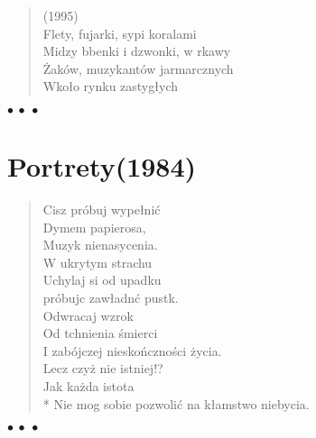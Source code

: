 \documentclass{article} %
\newenvironment{wiersz}[1]
	{\begin{verse} \hspace*{-1em}{\bf #1}}
	{\end{verse} \begin{center}$\bullet\ \bullet\ \bullet$\end{center}}
\newenvironment{wierszd}[2]
	{\begin{verse} \hspace*{-1em}{\bf #1}\hfill{\small{(#2)}}\\[.5ex] }
	{\end{verse} \begin{center}$\bullet\ \bullet\ \bullet$\end{center}}
\newcommand{\chap}[1]{\newpage\section*{#1}}
\newcommand{\e}{\eob}
\renewcommand{\a}{\aob}
\renewcommand{\o}{\'{o}}
\newcommand{\n}{\'{n}}
\newcommand{\s}{\'{s}}
\newcommand{\ci}{\'{c}}
\begin{document}
\begin{wierszd}
{Praga}{1995}
Flety, fujarki, sypi{\a} koralami \\
Mi{\e}dzy b{\e}benki i dzwonki, w r{\e}kawy \\
\.{Z}ak{\o}w, muzykant{\o}w jarmarcznych \\
Wko{\l}o rynku zastyg{\l}ych \\
\hspace*{6em}{w kamienne fasady.}
\end{wierszd}


\chap{Portrety\hfill{\small{(1984)}}}\vspace*{2ex}

\begin{wiersz} {Heideggerowi  \\*[1ex]}
Cisz{\e} pr{\o}buj{\a} wype{\l}ni{\ci} \\ 
Dymem papierosa, \\ 
Muzyk{\a} nienasycenia. \\ 
W ukrytym strachu \\ 
Uchylaj{\a} si{\e} od upadku \\ 
pr{\o}buj{\a}c zaw{\l}adn{\a}{\ci} pustk{\a}. \\ 
Odwracaj{\a} wzrok \\ 
Od tchnienia {\s}mierci \\ 
I zab{\o}jczej niesko{\n}czno{\s}ci \.{z}ycia. \\ 
Lecz czy\.{z} nie istniej{\a}!? \\ 
Jak ka\.{z}da istota \\*
Nie mog{\a} sobie pozwoli{\ci} na k{\l}amstwo niebycia.

\end{wiersz}
\end{document}
